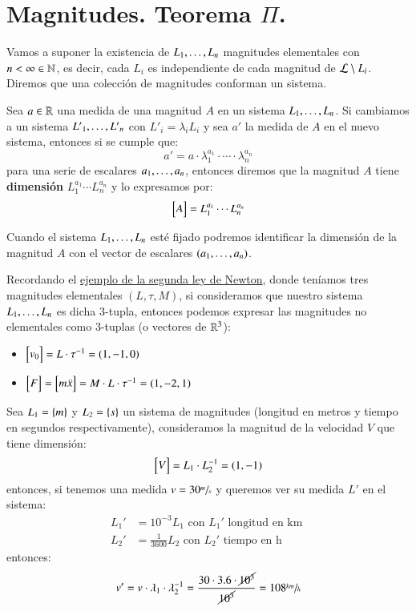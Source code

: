 \section{Magnitudes. Teorema $\Pi$.}

Vamos a suponer la existencia de ${L}_{1}, \ldots, {L}_{n}$ magnitudes elementales con $n < \infty \in \mathbb{N}$, es decir, cada $L_i$ es independiente de cada magnitud de $\mathcal{L} \setminus L_i$. Diremos que una colección de magnitudes conforman un sistema.

\begin{dfn}
    Sea $a \in \mathbb{R}$ una medida de una magnitud $A$ en un sistema ${L}_{1}, \ldots, {L}_{n}$. Si cambiamos a un sistema ${L'}_{1}, \ldots, {L'}_{n}$ con $L'_i = \lambda_i L_i$ y sea $a'$ la medida de $A$ en el nuevo sistema, entonces si se cumple que:
    $$
        a' = a \cdot \lambda_1^{a_1} \cdot \cdots \cdot \lambda_n^{a_n}
    $$
    para una serie de escalares ${a}_{1}, \ldots, {a}_{n}$, entonces diremos que la magnitud $A$ tiene \textbf{dimensión} $L_{1}^{a_1} \cdots L_{n}^{a_n}$ y lo expresamos por:
    $$
        \mx{A} = L_{1}^{a_1} \cdots L_{n}^{a_n}
    $$

    Cuando el sistema ${L}_{1}, \ldots, {L}_{n}$ esté fijado podremos identificar la dimensión de la magnitud $A$ con el vector de escalares $({a}_{1}, \ldots, {a}_{n})$.
\end{dfn}

Recordando el \hyperref[eg:1]{ejemplo de la segunda ley de Newton}, donde teníamos tres magnitudes elementales $(L, \tau, M)$, si consideramos que nuestro sistema ${L}_{1}, \ldots, {L}_{n}$ es dicha $3$-tupla, entonces podemos expresar las magnitudes no elementales como $3$-tuplas (o vectores de $\mathbb{R}^3$):
\begin{itemize}
    \item $\mx{v_0} = L \cdot \tau^{-1} = (1, -1, 0)$
    \item $\mx{F} = \mx{m \ddot x} = M \cdot L \cdot \tau^{-1} =  (1, -2, 1)$
\end{itemize}

\begin{eg}
    Sea $L_1 = \left\{m\right\} $ y $L_2=\left\{s\right\}$ un sistema de magnitudes (longitud en metros y tiempo en segundos  respectivamente), consideramos la magnitud de la velocidad $V$ que tiene dimensión:
    $$
        \mx{V} = L_1 \cdot L_2^{-1} = (1, -1)
    $$
    entonces, si tenemos una medida $v = 30 \sfrac{m}{s}$ y queremos ver su medida $L'$ en el sistema:
    \begin{align*}
        L_1' &= 10^{-3} L_1 \text{ con $L_1'$ longitud en km }\\
        L_2' &= \frac{1}{3600} L_2 \text{ con $L_2'$ tiempo en h }
    \end{align*}
    entonces:
    $$
        v' = v \cdot \lambda_1 \cdot \lambda_2^{-1} = \frac{30 \cdot 3.6 \cdot \cancel{10^3}}{\cancel{10^3}} = 108 \sfrac{km}{h}
    $$
\end{eg}

